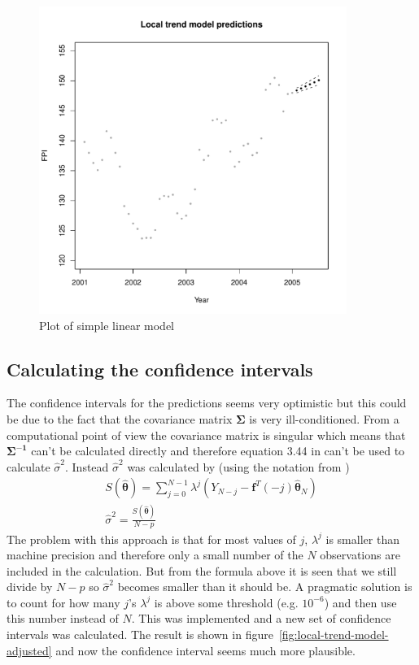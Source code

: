 \documentclass[11pt]{article}
\begin{document}
\begin{figure}
    \centering
    \includegraphics[width=100mm]{local-trend-predict-normal-6.pdf}
    \caption{Plot of simple linear model}
    \label{fig:local-trend-model-normal}
\end{figure}

\subsection*{Calculating the confidence intervals}
The confidence intervals for the predictions seems very optimistic but this could be due to the fact that the covariance matrix $\mathbf{\Sigma}$ is very ill-conditioned. From a computational point of view the covariance matrix is singular which means that $\mathbf{\Sigma^{-1}}$ can't be calculated directly and therefore equation 3.44 in \cite{hm} can't be used to calculate $\widehat{\sigma}^2$. Instead $\widehat{\sigma}^2$ was calculated by (using the notation from \cite{hm})
\begin{gather*}
    S(\widehat{\boldsymbol{\theta}}) = \sum_{j=0}^{N-1} \lambda^j(Y_{N-j} - \boldsymbol{f}^T(-j)\widehat{\boldsymbol{\theta}}_N) \\
    \widehat{\sigma}^2 = \frac{S(\widehat{\boldsymbol{\theta}})}{N-p}
\end{gather*}
The problem with this approach is that for most values of $j$, $\lambda^j$ is smaller than machine precision and therefore only a small number of the $N$ observations are included in the calculation. But from the formula above it is seen that we still divide by $N-p$ so $\widehat{\sigma}^2$ becomes smaller than it should be. A pragmatic solution is to count for how many $j$'s $\lambda^j$ is above some threshold (e.g. $10^{-6}$) and then use this number instead of $N$. This was implemented and a new set of confidence intervals was calculated. The result is shown in figure~\ref{fig:local-trend-model-adjusted} and now the confidence interval seems much more plausible.
\end{document}
